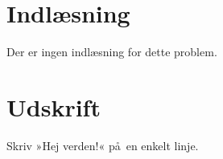 
\section*{Indlæsning}

Der er ingen indlæsning for dette problem.

\section*{Udskrift}

Skriv  »Hej verden!« på en enkelt linje.
